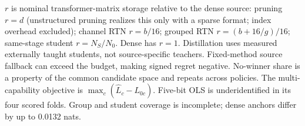 \begin{table}[H]
\begin{tabular}{llrrrr}
\hline
\end{tabular}
\par\smallskip
\begin{minipage}{\linewidth}\footnotesize
$r$ is nominal transformer-matrix storage relative to the dense source: pruning $r=d$ (unstructured pruning realizes this only with a sparse format; index overhead excluded); channel RTN $r=b/16$; grouped RTN $r=(b+16/g)/16$; same-stage student $r=N_S/N_0$. Dense has $r=1$. Distillation uses measured externally taught students, not source-specific teachers. Fixed-method source fallback can exceed the budget, making signed regret negative. No-winner share is a property of the common candidate space and repeats across policies. The multi-capability objective is $\max_c(\widehat L_c-L_{0c})$. Five-bit OLS is underidentified in its four scored folds. Group and student coverage is incomplete; dense anchors differ by up to 0.0132 nats.
\end{minipage}
\end{table}
